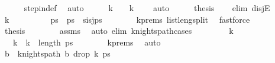 \begin{isabellebody}
\ \ \ \ \isamarkupfalse%
\ step{\isacharunderscore}{\kern0pt}in{\isacharunderscore}{\kern0pt}def\ \isamarkupfalse%
\ auto\isanewline
\ \ \isamarkupfalse%
\ \isamarkupfalse%
\ {\isachardoublequoteopen}k\ {\isacharequal}{\kern0pt}\ {}\ {\isasymor}\ k\ {\isachargreater}{\kern0pt}\ {}{\isachardoublequoteclose}\ \isamarkupfalse%
\ auto\isanewline
\ \ \isamarkupfalse%
\ \isamarkupfalse%
\ {\isacharquery}{\kern0pt}thesis\isanewline
\ \ \isamarkupfalse%
\ {\isacharparenleft}{\kern0pt}elim\ disjE{\isacharparenright}{\kern0pt}\isanewline
\ \ \ \ \isamarkupfalse%
\ {\isachardoublequoteopen}k\ {\isacharequal}{\kern0pt}\ {}{\isachardoublequoteclose}\isanewline
\ \ \ \ \isamarkupfalse%
\ \isamarkupfalse%
\ ps{\isacharprime}{\kern0pt}\ \ {\isachardoublequoteopen}ps\ {\isacharequal}{\kern0pt}\ s\isactrlsub i{\isacharhash}{\kern0pt}s\isactrlsub j{\isacharhash}{\kern0pt}ps{\isacharprime}{\kern0pt}{\isachardoublequoteclose}\isanewline
\ \ \ \ \ \ \isamarkupfalse%
\ k{\isacharunderscore}{\kern0pt}prems\ list{\isacharunderscore}{\kern0pt}len{\isacharunderscore}{\kern0pt}g{\isacharunderscore}{\kern0pt}{}{\isacharunderscore}{\kern0pt}split\ \isamarkupfalse%
\ fastforce\isanewline
\ \ \ \ \isamarkupfalse%
\ \isamarkupfalse%
\ {\isacharquery}{\kern0pt}thesis\isanewline
\ \ \ \ \ \ \isamarkupfalse%
\ assms\ \isamarkupfalse%
\ {\isacharparenleft}{\kern0pt}auto\ elim{\isacharcolon}{\kern0pt}\ knights{\isacharunderscore}{\kern0pt}path{\isachardot}{\kern0pt}cases{\isacharparenright}{\kern0pt}\isanewline
\ \ \isamarkupfalse%
\isanewline
\ \ \ \ \isamarkupfalse%
\ {\isachardoublequoteopen}k\ {\isachargreater}{\kern0pt}\ {}{\isachardoublequoteclose}\isanewline
\ \ \ \ \isamarkupfalse%
\ \isamarkupfalse%
\ {\isachardoublequoteopen}{}\ {\isacharless}{\kern0pt}\ k{\isacharminus}{\kern0pt}{}\ {\isasymand}\ k{\isacharminus}{\kern0pt}{}\ {\isacharless}{\kern0pt}\ length\ ps{\isachardoublequoteclose}\isanewline
\ \ \ \ \ \ \isamarkupfalse%
\ k{\isacharunderscore}{\kern0pt}prems\ \isamarkupfalse%
\ auto\isanewline
\ \ \ \ \isamarkupfalse%
\ \isamarkupfalse%
\ b\ \ {\isachardoublequoteopen}knights{\isacharunderscore}{\kern0pt}path\ b\ {\isacharparenleft}{\kern0pt}drop\ {\isacharparenleft}{\kern0pt}k{\isacharminus}{\kern0pt}{}{\isacharparenright}{\kern0pt}\ ps{\isacharparenright}{\kern0pt}{\isachardoublequoteclose}\isanewline

\end{isabellebody}

